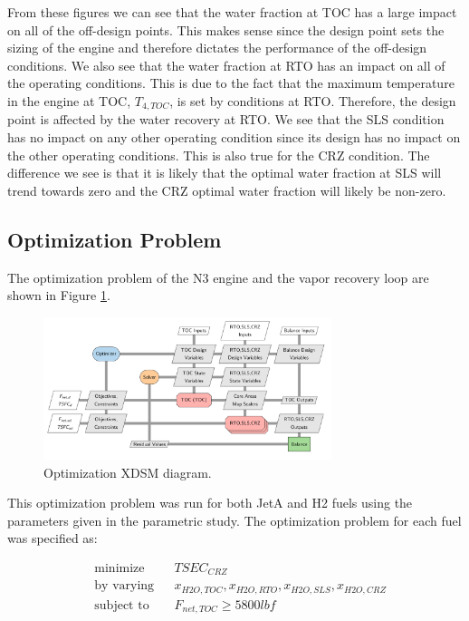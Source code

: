 \documentclass[12pt]{article}
\begin{document}
\noindent
From these figures we can see that the water fraction at TOC has a large impact on all of the off-design points. This makes sense since the design point sets the sizing of the engine and therefore dictates the performance of the off-design conditions. We also see that the water fraction at RTO has an impact on all of the operating conditions. This is due to the fact that the maximum temperature in the engine at TOC, $T_{4,TOC}$, is set by conditions at RTO. Therefore, the design point is affected by the water recovery at RTO. We see that the SLS condition has no impact on any other operating condition since its design has no impact on the other operating conditions. This is also true for the CRZ condition. The difference we see is that it is likely that the optimal water fraction at SLS will trend towards zero and the CRZ optimal water fraction will likely be non-zero.

\subsection{Optimization Problem}
The optimization problem of the N3 engine and the vapor recovery loop are shown in Figure \ref{fig:N3_xdsm_opt}.

\begin{figure}[!hbt]
    \centering
    \includegraphics[width=0.75\textwidth]{N3_xdsm_opt.pdf}
    \caption{Optimization XDSM diagram.}
    \label{fig:N3_xdsm_opt}
\end{figure}

\noindent
This optimization problem was run for both JetA and H2 fuels using the parameters given in the parametric study.
The optimization problem for each fuel was specified as:

\begin{equation*}
    \begin{aligned}
         & {\text{minimize}}
         &                     & TSEC_{CRZ}                                         \\
         & {\text{by varying}}
         &                     & x_{H2O,TOC}, x_{H2O,RTO}, x_{H2O,SLS}, x_{H2O,CRZ} \\
         & \text{subject to}
         &                     & F_{net,TOC} \geq 5800 lbf                          \\
    \end{aligned}
\end{equation*}
\end{document}
